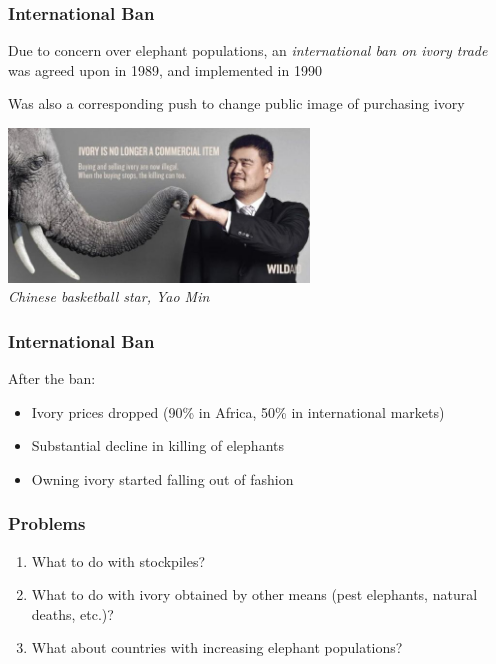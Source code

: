 \documentclass[10pt]{beamer}
\begin{document}
\begin{frame}[t]
\frametitle{International Ban}
\vspace{0.5cm}

	Due to concern over elephant populations, an \emph{international ban on ivory trade} was agreed upon in 1989, and implemented in 1990\\
	
	\vspace{0.5cm}
	
	Was also a corresponding push to change public image of purchasing ivory\\
	
	\vspace{0.5cm}
	
	\begin{center}
		\includegraphics[width=0.60\textwidth]{figures/campain1.jpg}\\
		\footnotesize{\emph{Chinese basketball star, Yao Min}}
	\end{center}
\end{frame}


\begin{frame}[t]
\frametitle{International Ban}
\vspace{0.5cm}

	After the ban:
	\medskip
		\begin{itemize}
			\item Ivory prices dropped (90\% in Africa, 50\% in international markets)
			\medskip
			\item Substantial decline in killing of elephants
			\medskip
			\item Owning ivory started falling out of fashion
		\end{itemize}
\end{frame}


\begin{frame}[t]
\frametitle{Problems}
\vspace{0.5cm}

	\begin{enumerate}
		\item What to do with stockpiles?
		\medskip
		\item What to do with ivory obtained by other means (pest elephants, natural deaths, etc.)?
		\medskip
		\item What about countries with increasing elephant populations?
	\end{enumerate}
\end{frame}
\end{document}
